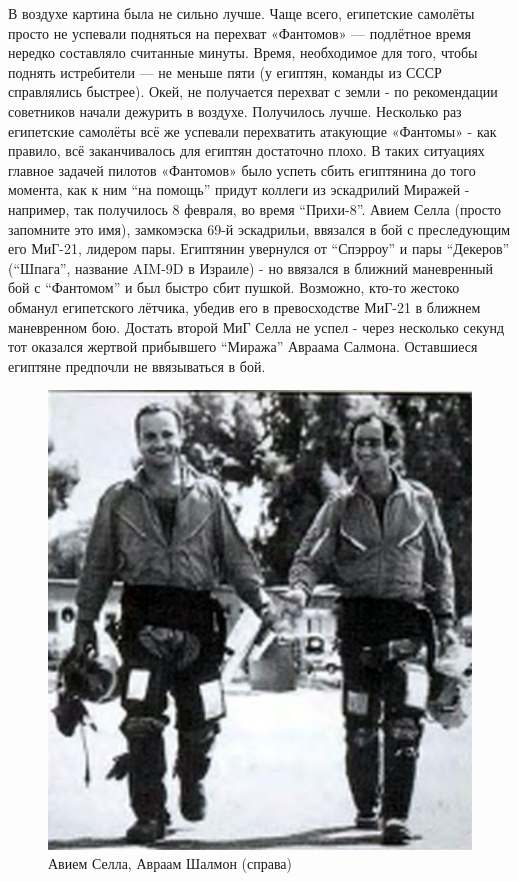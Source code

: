 В воздухе картина была не сильно лучше. Чаще всего, египетские самолёты просто не успевали подняться на перехват «Фантомов» — подлётное время нередко составляло считанные минуты. Время, необходимое для того, чтобы поднять истребители — не меньше пяти (у египтян, команды из СССР справлялись быстрее). Окей, не получается перехват с земли - по рекомендации советников начали дежурить в воздухе. Получилось лучше. Несколько раз египетские самолёты всё же успевали перехватить атакующие «Фантомы» - как правило, всё заканчивалось для египтян достаточно плохо. В таких ситуациях главное задачей пилотов «Фантомов» было успеть сбить египтянина до того момента, как к ним “на помощь” придут коллеги из эскадрилий Миражей - например, так получилось 8 февраля, во время “Прихи-8”. Авием Селла (просто запомните это имя), замкомэска 69-й эскадрильи, ввязался в бой с преследующим его МиГ-21, лидером пары. Египтянин увернулся от “Спэрроу” и пары “Декеров” (“Шпага”, название AIM-9D в Израиле) - но ввязался в ближний маневренный бой с “Фантомом” и был быстро сбит пушкой. Возможно, кто-то жестоко обманул египетского лётчика, убедив его в превосходстве МиГ-21 в ближнем маневренном бою. Достать второй МиГ Селла не успел - через несколько секунд тот оказался жертвой прибывшего “Миража” Авраама Салмона. Оставшиеся египтяне предпочли не ввязываться в бой.

\begin{figure}[h!tb] 
	\centering\includegraphics[scale=0.4]{Dolina_2/OXgUBXELWoU.jpg}
	\caption{Авием Селла, Авраам Шалмон (справа)}%
\end{figure}

